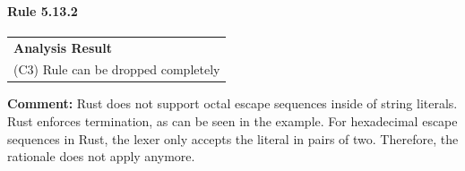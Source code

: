\paragraph{Rule 5.13.2}
\begin{longtable}{p{13cm}}
\textbf{Analysis Result} \\
(C3) Rule can be dropped completely \\
\end{longtable}
\textbf{Comment:} Rust does not support octal escape sequences inside of string literals. Rust enforces termination, as can be seen in the example. For hexadecimal escape sequences in Rust, the lexer only accepts the literal in pairs of two. Therefore, the rationale does not apply anymore. \\


